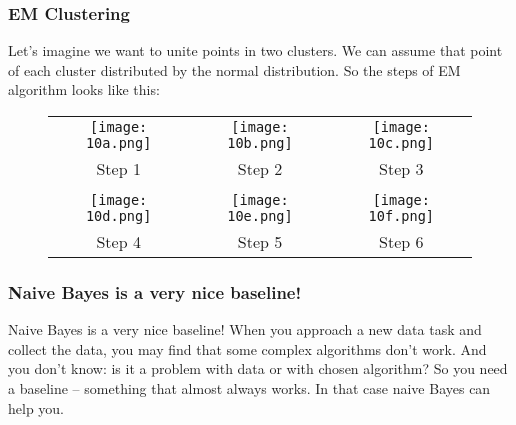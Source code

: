 \subsubsection*{EM Clustering}

Let's imagine we want to unite points in two clusters. We can assume that point of each cluster distributed by the normal distribution. So the steps of EM algorithm looks like this:\\
\begin{figure}[H]
  \centering
  \begin{tabular}{ccc}
    \texttt{[image: 10a.png]} & \hspace{0.5cm}
    \texttt{[image: 10b.png]} & \hspace{0.5cm}
    \texttt{[image: 10c.png]} \\
    Step 1 & Step 2 & Step 3 \\
    & & \\
    \texttt{[image: 10d.png]} & \hspace{0.5cm}
    \texttt{[image: 10e.png]} & \hspace{0.5cm}
    \texttt{[image: 10f.png]} \\
    Step 4 & Step 5 & Step 6 \\
  \end{tabular}
\end{figure}

\subsubsection*{Naive Bayes is a very nice baseline!}

Naive Bayes is a very nice baseline! When you approach a new data task and collect the data, you may find that some complex algorithms don't work. And you don't know: is it a problem with data or with chosen algorithm? So you need a baseline -- something that almost always works. In that case naive Bayes can help you.